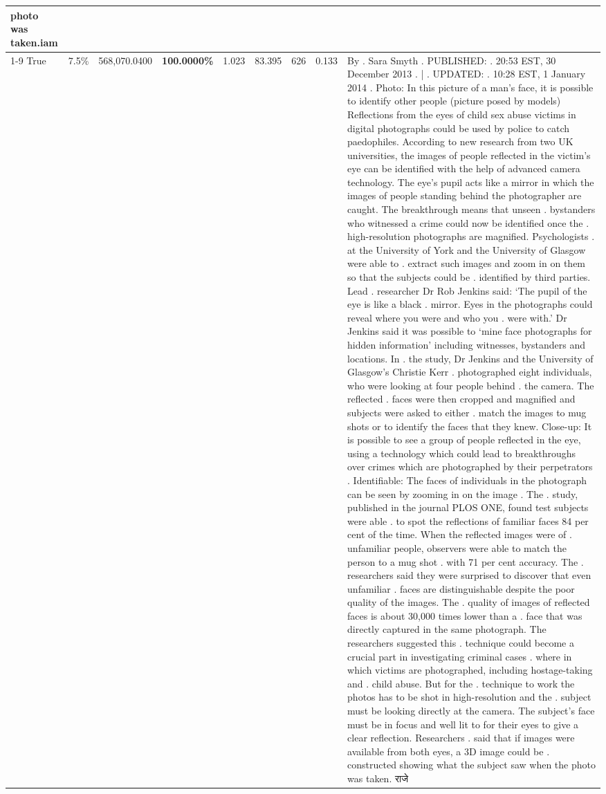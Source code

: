 \begin{table}[H]
\begin{tabular}{lllrlllll}
photo was taken.iam \\
\cline{1-9} \cline{2-9}
True & 7.5\% & 568,070.0400 & \bfseries \color{red} 100.0000\% & 1.023 & 83.395 & 626 & 0.133 & By . Sara Smyth . PUBLISHED: . 20:53 EST, 30 December 2013 . | . UPDATED: . 10:28 EST, 1 January 2014 . Photo: In this picture of a man's face, it is possible to identify other people (picture posed by models) Reflections from the eyes of child sex abuse victims in digital photographs could be used by police to catch paedophiles. According to new research from two UK universities, the images of people reflected in the victim's eye can be identified with the help of advanced camera technology. The eye's pupil acts like a mirror in which the images of people standing behind the photographer are caught. The breakthrough means that unseen . bystanders who witnessed a crime could now be identified once the . high-resolution photographs are magnified. Psychologists . at the University of York and the University of Glasgow were able to . extract such images and zoom in on them so that the subjects could be . identified by third parties. Lead . researcher Dr Rob Jenkins said: ‘The pupil of the eye is like a black . mirror. Eyes in the photographs could reveal where you were and who you . were with.' Dr Jenkins said it was possible to ‘mine face photographs for hidden information' including witnesses, bystanders and locations. In . the study, Dr Jenkins and the University of Glasgow's Christie Kerr . photographed eight individuals, who were looking at four people behind . the camera. The reflected . faces were then cropped and magnified and subjects were asked to either . match the images to mug shots or to identify the faces that they knew. Close-up: It is possible to see a group of people reflected in the eye, using a technology which could lead to breakthroughs over crimes which are photographed by their perpetrators . Identifiable: The faces of individuals in the photograph can be seen by zooming in on the image . The . study, published in the journal PLOS ONE, found test subjects were able . to spot the reflections of familiar faces 84 per cent of the time. When the reflected images were of . unfamiliar people, observers were able to match the person to a mug shot . with 71 per cent accuracy. The . researchers said they were surprised to discover that even unfamiliar . faces are distinguishable despite the poor quality of the images. The . quality of images of reflected faces is about 30,000 times lower than a . face that was directly captured in the same photograph. The researchers suggested this . technique could become a crucial part in investigating criminal cases . where in which victims are photographed, including hostage-taking and . child abuse. But for the . technique to work the photos has to be shot in high-resolution and the . subject must be looking directly at the camera. The subject's face must be in focus and well lit to for their eyes to give a clear reflection. Researchers . said that if images were available from both eyes, a 3D image could be . constructed showing what the subject saw when the photo was taken. राजे \\

\end{tabular}
\end{table}
